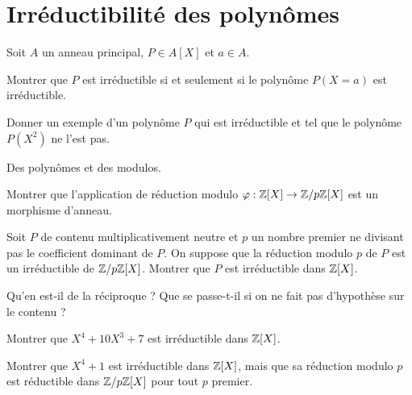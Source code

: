 \documentclass[french]{report}
\begin{document}
\section*{Irréductibilité des polynômes}

\begin{exo}
    Soit \(A\) un anneau principal, \(P\in A[X]\) et \(a\in A\).
    \begin{q}{1}
        Montrer que \(P\) est irréductible si et seulement si le polynôme \(P(X=a)\)
        est irréductible.
    \end{q}
    \begin{q}{2}
        Donner un exemple d'un polynôme \(P\) qui est irréductible et tel que le
        polynôme \(P(X^2)\) ne l'est pas.
    \end{q}
\end{exo}

\begin{exo}
    Des polynômes et des modulos.
    \begin{q}{1}
        Montrer que l'application de réduction modulo \(\varphi:\mathbb{Z}[X]\to\mathbb{Z}/p\mathbb{Z}[X]\)
        est un morphisme d'anneau.
    \end{q}
    \begin{q}{2}
        Soit \(P\) de contenu multiplicativement neutre et \(p\) un nombre premier ne
        divisant pas le coefficient dominant de \(P\). On suppose que la réduction modulo
        \(p\) de \(P\) est un irréductible de \(\mathbb{Z}/p\mathbb{Z}[X]\). Montrer que \(P\) est irréductible
        dans \(\mathbb{Z}[X]\).
    \end{q}
    \begin{q}{3}
        Qu'en est-il de la réciproque ? Que se passe-t-il si on ne fait pas d'hypothèse
        sur le contenu ?
    \end{q}
    \begin{q}{4}
        Montrer que \(X^4+10X^3+7\) est irréductible dans \(\mathbb{Z}[X]\).
    \end{q}
    \begin{q}{5}
        Montrer que \(X^4+1\) est irréductible dans \(\mathbb{Z}[X]\), mais que sa réduction
        modulo \(p\) est réductible dans \(\mathbb{Z}/p\mathbb{Z}[X]\) pour tout \(p\) premier.
    \end{q}
\end{exo}
\end{document}
